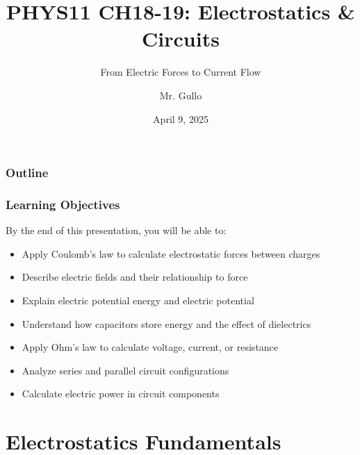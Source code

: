 \documentclass{beamer}
\title[Electrostatics \& Circuits]{PHYS11 CH18-19: Electrostatics \& Circuits}
\subtitle{From Electric Forces to Current Flow}
\author[Mr. Gullo]{Mr. Gullo}
\date[April 2025]{April 9, 2025}
\begin{document}
\begin{frame}
    \titlepage
\end{frame}

\begin{frame}
    \frametitle{Outline}
    \tableofcontents
\end{frame}

\begin{frame}
    \frametitle{Learning Objectives}
    \begin{block}{By the end of this presentation, you will be able to:}
        \begin{itemize}
            \item Apply Coulomb's law to calculate electrostatic forces between charges
            \item Describe electric fields and their relationship to force
            \item Explain electric potential energy and electric potential
            \item Understand how capacitors store energy and the effect of dielectrics
            \item Apply Ohm's law to calculate voltage, current, or resistance
            \item Analyze series and parallel circuit configurations
            \item Calculate electric power in circuit components
        \end{itemize}
    \end{block}
\end{frame}

\section{Electrostatics Fundamentals}
\end{document}
